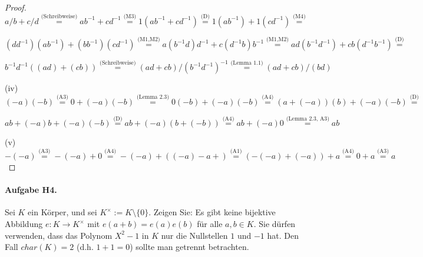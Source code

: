 \documentclass[12pt, letterpaper]{article}
\begin{document}
\begin{proof}
        \par \hspace*{7mm} 
        $a/b + c/d \overset{\text{(Schreibweise)}}{=} ab^{-1}+cd^{-1} \overset{\text{(M3)}}{=}
        1(ab^{-1}+cd^{-1}) \overset{\text{(D)}}{=} 1(ab^{-1}) + 1(cd^{-1}) \overset{\text{(M4)}}{=}$ \par \hspace*{7mm} 
        $(dd^{-1})(ab^{-1}) + (bb^{-1})(cd^{-1}) \overset{\text{(M1,M2)}}{=} a(b^{-1}d)d^{-1} + c(d^{-1}b)b^{-1}
        \overset{\text{(M1,M2)}}{=} ad(b^{-1}d^{-1}) + cb(d^{-1}b^{-1}) \overset{\text{(D)}}{=}$ \par \hspace*{7mm}  
        $b^{-1}d^{-1}((ad)+(cb)) \overset{\text{(Schreibweise)}}{=} (ad + cb)/(b^{-1}d^{-1})^{-1} \overset{\text{(Lemma 1.1)}}{=} (ad + cb)/(bd)$ 
        \\ \par
    (iv) $(-a)(-b) \overset{\text{(A3)}}{=} 0 + (-a)(-b) \overset{\text{(Lemma 2.3)}}{=} 0(-b)+(-a)(-b) \overset{\text{(A4)}}{=}
        (a+(-a))(b)+(-a)(-b) \overset{\text{(D)}}{=}$ \par \hspace*{7mm}   $ab +(-a)b+(-a)(-b) \overset{\text{(D)}}{=} 
        ab+(-a)(b+(-b)) \overset{\text{(A4)}}{=} ab+(-a)0 \overset{\text{(Lemma 2.3, A3)}}{=} ab$ \\
    \par
    (v) $-(-a) \overset{\text{(A3)}}{=} -(-a) + 0 \overset{\text{(A4)}}{=} -(-a) + ((-a)-a+) 
        \overset{\text{(A1)}}{=} (-(-a)+(-a))+a \overset{\text{(A4)}}{=} 0 + a \overset{\text{(A3)}}{=} a$
    \par
\end{proof}


\paragraph{Aufgabe H4.}

Sei $K$ ein Körper, und sei $K^\times  := K \setminus  \{0\}$. Zeigen Sie: Es gibt keine
bijektive Abbildung $e : K \to K^\times$ mit $e(a + b) = e(a)e(b)$ für alle $a, b \in  K$. Sie
dürfen verwenden, dass das Polynom $X^2 - 1$ in $K$ nur die Nullstellen $1$ und $-1$ hat.
Den Fall $char(K) = 2$  (d.h. $1 + 1 = 0$) sollte man getrennt betrachten.
\end{document}
